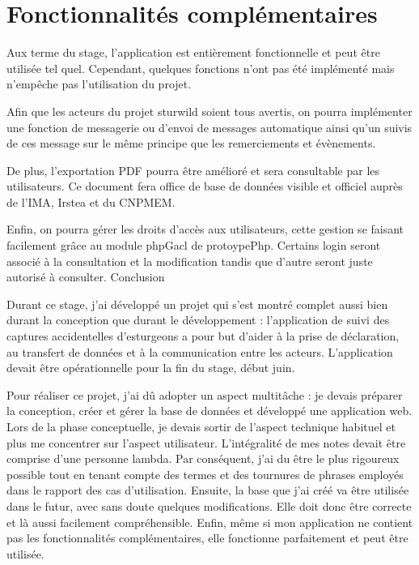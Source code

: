 \documentclass[12pt,a4paper,titlepage,twoside]{report}
\begin{document}
\section{Fonctionnalités complémentaires}

Aux terme du stage, l'application est entièrement fonctionnelle et peut être utilisée tel quel. Cependant, quelques fonctions n'ont pas été implémenté mais n'empêche pas l'utilisation du projet.

Afin que les acteurs du projet sturwild soient tous avertis, on pourra implémenter une fonction de messagerie ou d'envoi de messages automatique ainsi qu'un suivis de ces message sur le même principe que les remerciements et évènements. 

De plus, l'exportation PDF pourra être amélioré et sera consultable par les utilisateurs. Ce document fera office de base de données visible et officiel auprès de l'IMA, Irstea et du CNPMEM.

Enfin, on pourra gérer les droits d'accès aux utilisateurs, cette gestion se faisant facilement grâce au module phpGacl de protoypePhp. Certains login seront associé à la consultation et la modification tandis que d'autre seront juste autorisé à consulter. 
\clearpage
\LARGE{Conclusion}\normalsize\newline

Durant ce stage, j'ai développé un projet qui s'est montré complet aussi bien durant la conception que durant le développement : l'application de suivi des captures accidentelles d'esturgeons a pour but d'aider à la prise de déclaration, au transfert de données et à la communication entre les acteurs. L'application devait être opérationnelle pour la fin du stage, début juin.

Pour réaliser ce projet, j'ai dû adopter un aspect multitâche : je devais préparer la conception, créer et gérer la base de données et développé une application web. Lors de la phase conceptuelle, je devais sortir de l'aspect technique habituel et plus me concentrer sur l'aspect utilisateur. L'intégralité de mes notes devait être comprise d'une personne lambda. Par conséquent, j'ai du être le plus rigoureux possible tout en tenant compte des termes et des tournures de phrases employés dans le rapport des cas d'utilisation. Ensuite, la base que j'ai créé va être utilisée dans le futur, avec sans doute quelques modifications. Elle doit donc être correcte et là aussi facilement compréhensible. Enfin, même si mon application ne contient pas les fonctionnalités complémentaires, elle fonctionne parfaitement et peut être utilisée.\newline
\end{document}
